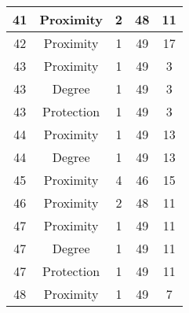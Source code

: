 \documentclass[results.tex]{subfiles}
\begin{document}
\begin{center}
\begin{tabular}{| c || c | c | c | c |}
            \hline
            41                      & Proximity                    & 2                      & 48                      & 11                   \\
            \hline
            42                      & Proximity                    & 1                      & 49                      & 17                   \\
            \hline
            43                      & Proximity                    & 1                      & 49                      & 3                    \\
            \hline
            43                      & Degree                       & 1                      & 49                      & 3                    \\
            \hline
            43                      & Protection                   & 1                      & 49                      & 3                    \\
            \hline
            44                      & Proximity                    & 1                      & 49                      & 13                   \\
            \hline
            44                      & Degree                       & 1                      & 49                      & 13                   \\
            \hline
            45                      & Proximity                    & 4                      & 46                      & 15                   \\
            \hline
            46                      & Proximity                    & 2                      & 48                      & 11                   \\
            \hline
            47                      & Proximity                    & 1                      & 49                      & 11                   \\
            \hline
            47                      & Degree                       & 1                      & 49                      & 11                   \\
            \hline
            47                      & Protection                   & 1                      & 49                      & 11                   \\
            \hline
            48                      & Proximity                    & 1                      & 49                      & 7                    \\

\end{tabular}
\end{center}
\end{document}
